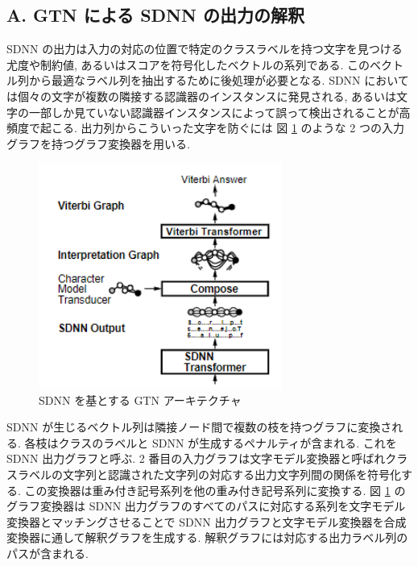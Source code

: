 \documentclass[twocolumn]{jarticle}     %
\begin{document}
\subsection*{A. GTN による SDNN の出力の解釈}
SDNN の出力は入力の対応の位置で特定のクラスラベルを持つ文字を見つける尤度や制約値, あるいはスコアを符号化したベクトルの系列である.
このベクトル列から最適なラベル列を抽出するために後処理が必要となる.
SDNN においては個々の文字が複数の隣接する認識器のインスタンスに発見される, あるいは文字の一部しか見ていない認識器インスタンスによって誤って検出されることが高頻度で起こる.
出力列からこういった文字を防ぐには 図 \ref{fig:24} のような 2 つの入力グラフを持つグラフ変換器を用いる.
\begin{figure}[t]
  \centering
  \includegraphics[width=80mm]{assets/24.png}
  \caption{SDNN を基とする GTN アーキテクチャ}
  \label{fig:24}
\end{figure}
SDNN が生じるベクトル列は隣接ノード間で複数の枝を持つグラフに変換される.
各枝はクラスのラベルと SDNN が生成するペナルティが含まれる. これを SDNN 出力グラフと呼ぶ.
2 番目の入力グラフは文字モデル変換器と呼ばれクラスラベルの文字列と認識された文字列の対応する出力文字列間の関係を符号化する. この変換器は重み付き記号系列を他の重み付き記号系列に変換する. 図 \ref{fig:24} のグラフ変換器は SDNN 出力グラフのすべてのパスに対応する系列を文字モデル変換器とマッチングさせることで SDNN 出力グラフと文字モデル変換器を合成変換器に通して解釈グラフを生成する. 解釈グラフには対応する出力ラベル列のパスが含まれる.
\end{document}
